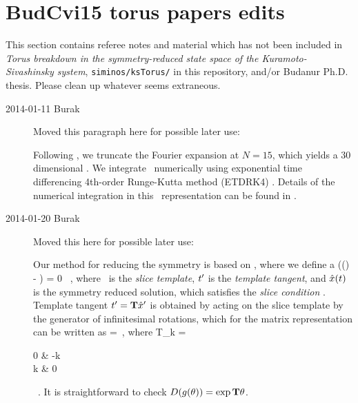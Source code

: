 
\section{BudCvi15 torus papers edits}

This section contains referee notes and material which has not been
included in \emph{Torus breakdown in the symmetry-reduced state space of
the Kuramoto-Sivashinsky system}, {\tt siminos/ksTorus/} in
this repository,  and/or Budanur Ph.D. thesis. Please clean up whatever
seems extraneous.

\begin{description}

\item[2014-01-11 Burak] Moved this paragraph here for possible later use:

Following , we truncate the Fourier expansion at $N = 15$,
which yields a $30$ dimensional \statesp . We integrate \KSe\ numerically
using exponential time differencing 4th-order Runge-Kutta method (ETDRK4)
. Details of the numerical integration in this \statesp\
representation can be found in .

\item[2014-01-20 Burak] Moved this here for possible later use:

Our method for reducing the  symmetry is based on \mslices ,
where we define a \slicePlane
\beq
    (\sspRed (\zeit) - \slicep) \cdot \sliceTan{} = 0 \, ,
    \label{e-SliceCond}
\eeq
where \slicep\ is the \emph{slice template}, $t'_{}$ is the \emph
{template tangent}, and $\hat{x}(t)$ is the symmetry reduced solution,
which satisfies the \emph{slice condition} \refeq{e-SliceCond}. Template
tangent $t'_{} = \mathbf{T} \hat{x}'$ is obtained by acting on the slice
template by the generator of infinitesimal \SOn{2} rotations, which for the
matrix representation \refeq{e-DSO2} can be written as
\beq
    \Lg = \,,
    \label{e-Lg}
\eeq
where
\beq
    T_k =  \begin{pmatrix}
        0 & -k   \\
        k & 0
            \end{pmatrix} \, .
\eeq
It is straightforward to check ${D} (g (\theta)) = \exp \mathbf{T}
\theta$.


\end{description}
